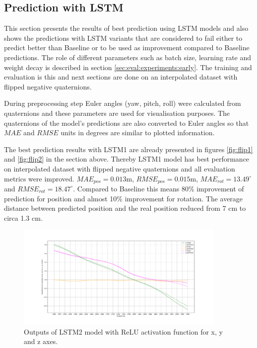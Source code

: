 \subsection{Prediction with LSTM}
\label{sec:eval:experiments:lstm}
This section presents the results of best prediction using LSTM models and also shows the predictions with LSTM variants that are considered to fail either to predict better than Baseline or to be used as improvement compared to Baseline predictions. The role of different parameters such as batch size, learning rate and weight decay is described in section \ref{sec:eval:experiments:early}. The training and evaluation is this and next sections are done on an interpolated dataset with flipped negative quaternions. 

During preprocessing step Euler angles (yaw, pitch, roll) were calculated from quaternions and these parameters are used for visualisation purposes. The quaternions of the model's predictions are also converted to Euler angles so that $MAE$ and $RMSE$ units in degrees are similar to plotted information. 

The best prediction results with LSTM1 are already presented in figures \ref{fig:flip1} and \ref{fig:flip2} in the section above. Thereby LSTM1 model has best performance on interpolated dataset with flipped negative quaternions and all evaluation metrics were improved. $MAE_{pos} = 0.013$m, $RMSE_{pos} = 0.015$m, $MAE_{rot} = 13.49^{\circ}$ and $RMSE_{rot} =18.47^{\circ}$. Compared to Baseline this means 80\% improvement of prediction for position and almost 10\% improvement for rotation. The average distance between predicted position and the real position reduced from 7 cm to circa 1.3 cm.
\begin{figure}[t]
	\begin{center}
		\includegraphics[width=0.9\textwidth, keepaspectratio]{gfx/lstm2_relu-xyz_position.pdf}
		\caption{\label{fig:lstm2-1} Outputs of LSTM2 model with ReLU activation function for x, y and z axes.}
	\end{center}
\end{figure}

